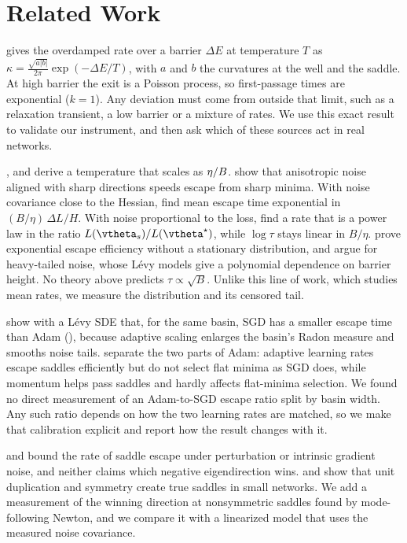 \section{Related Work}
\label{sec:related}

\citet{kramers1940brownian} gives the overdamped rate over a barrier $\Delta E$ at temperature $T$ as $\kappa=\frac{\sqrt{a|b|}}{2\pi}\exp(-\Delta E/T)$, with $a$ and $b$ the curvatures at the well and the saddle.
At high barrier the exit is a Poisson process, so first-passage times are exponential ($k=1$).
Any deviation must come from outside that limit, such as a relaxation transient, a low barrier or a mixture of rates.
We use this exact result to validate our instrument, and then ask which of these sources act in real networks.

\citet{mandt2017stochastic}, \citet{smith2018bayesian} and \citet{jastrzebski2018three} derive a temperature that scales as $\eta/B$.
\citet{zhu2019anisotropic} show that anisotropic noise aligned with sharp directions speeds escape from sharp minima.
With noise covariance close to the Hessian, \citet{xie2021diffusion} find mean escape time exponential in $(B/\eta)\,\Delta L/H$.
With noise proportional to the loss, \citet{mori2022powerlaw} find a rate that is a power law in the ratio $L(\vtheta_s)/L(\tstar)$, while $\log\tau$ stays linear in $B/\eta$.
\citet{ibayashi2021exponential} prove exponential escape efficiency without a stationary distribution, and \citet{simsekli2019tail} argue for heavy-tailed noise, whose L\'evy models give a polynomial dependence on barrier height.
No theory above predicts $\tau\propto\sqrt{B}$.
Unlike this line of work, which studies mean rates, we measure the distribution and its censored tail.

\citet{zhou2020towards} show with a L\'evy SDE that, for the same basin, SGD has a smaller escape time than Adam (\citet{kingma2015adam}), because adaptive scaling enlarges the basin's Radon measure and smooths noise tails.
\citet{xie2022adaptive} separate the two parts of Adam: adaptive learning rates escape saddles efficiently but do not select flat minima as SGD does, while momentum helps pass saddles and hardly affects flat-minima selection.
We found no direct measurement of an Adam-to-SGD escape ratio split by basin width.
Any such ratio depends on how the two learning rates are matched, so we make that calibration explicit and report how the result changes with it.

\citet{jin2017escape} and \citet{daneshmand2018escaping} bound the rate of saddle escape under perturbation or intrinsic gradient noise, and neither claims which negative eigendirection wins.
\citet{fukumizu2000local} and \citet{simsek2021geometry} show that unit duplication and symmetry create true saddles in small networks.
We add a measurement of the winning direction at nonsymmetric saddles found by mode-following Newton, and we compare it with a linearized model that uses the measured noise covariance.

